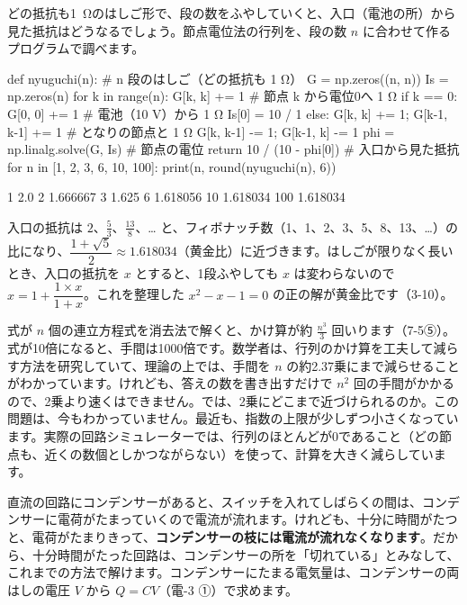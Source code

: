 \begin{motto}[4]
どの抵抗も\qty{1}{\ohm}のはしご形で、段の数をふやしていくと、入口（電池の所）から見た抵抗はどうなるでしょう。節点電位法の行列を、段の数 $n$ に合わせて作るプログラムで調べます。
\begin{phcode}[Python]
def nyuguchi(n):                  \# n 段のはしご（どの抵抗も 1 Ω）
    G = np.zeros((n, n))
    Is = np.zeros(n)
    for k in range(n):
        G[k, k] += 1              \# 節点 k から電位0へ 1 Ω
        if k == 0:
            G[0, 0] += 1          \# 電池（10 V）から 1 Ω
            Is[0] = 10 / 1
        else:
            G[k, k] += 1; G[k-1, k-1] += 1   \# となりの節点と 1 Ω
            G[k, k-1] -= 1; G[k-1, k] -= 1
    phi = np.linalg.solve(G, Is)  \# 節点の電位
    return 10 / (10 - phi[0])     \# 入口から見た抵抗
for n in [1, 2, 3, 6, 10, 100]:
    print(n, round(nyuguchi(n), 6))
\end{phcode}
\begin{phcodeout}[実行結果]
1 2.0
2 1.666667
3 1.625
6 1.618056
10 1.618034
100 1.618034
\end{phcodeout}
入口の抵抗は $2$、$\tfrac53$、$\tfrac{13}{8}$、… と、フィボナッチ数（1、1、2、3、5、8、13、…）の比になり、$\dfrac{1+\sqrt5}{2}\approx1.618034$（黄金比）に近づきます。はしごが限りなく長いとき、入口の抵抗を $x$ とすると、1段ふやしても $x$ は変わらないので $x=1+\dfrac{1\times x}{1+x}$。これを整理した $x^2-x-1=0$ の正の解が黄金比です（3-10）。
\end{motto}

\begin{phmada}
式が $n$ 個の連立方程式を消去法で解くと、かけ算が約 $\tfrac{n^3}{3}$ 回いります（7-5⑤）。式が10倍になると、手間は1000倍です。数学者は、行列のかけ算を工夫して減らす方法を研究していて、理論の上では、手間を $n$ の約2.37乗にまで減らせることがわかっています。けれども、答えの数を書き出すだけで $n^2$ 回の手間がかかるので、2乗より速くはできません。では、2乗にどこまで近づけられるのか。この問題は、今もわかっていません。最近も、指数の上限が少しずつ小さくなっています。実際の回路シミュレーターでは、行列のほとんどが0であること（どの節点も、近くの数個としかつながらない）を使って、計算を大きく減らしています。
\end{phmada}


\leavevmode\label{ph:電-5:sec11}直流の回路にコンデンサーがあると、スイッチを入れてしばらくの間は、コンデンサーに電荷がたまっていくので電流が流れます。けれども、十分に時間がたつと、電荷がたまりきって、\textbf{コンデンサーの枝には電流が流れなくなります}。だから、十分時間がたった回路は、コンデンサーの所を「切れている」とみなして、これまでの方法で解けます。コンデンサーにたまる電気量は、コンデンサーの両はしの電圧 $V$ から $Q=CV$（電-3 ①）で求めます。

